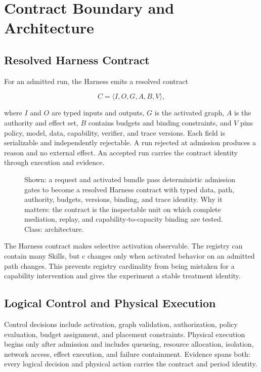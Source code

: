 \section{Contract Boundary and Architecture}
\label{sec:architecture}

\subsection{Resolved Harness Contract}

For an admitted run, the Harness emits a resolved contract

\begin{equation}
C=\langle I,O,G,A,B,V\rangle,
\end{equation}

where $I$ and $O$ are typed inputs and outputs, $G$ is the activated graph, $A$ is the authority and effect set, $B$ contains budgets and binding constraints, and $V$ pins policy, model, data, capability, verifier, and trace versions. Each field is serializable and independently rejectable. A run rejected at admission produces a reason and no external effect. An accepted run carries the contract identity through execution and evidence.

\begin{figure}[t]
\centering
\caption{Shown: a request and activated bundle pass deterministic admission gates to become a resolved Harness contract with typed data, path, authority, budgets, versions, binding, and trace identity. Why it matters: the contract is the inspectable unit on which complete mediation, replay, and capability-to-capacity binding are tested. Class: architecture.}
\label{fig:harness-contract}
\end{figure}

The Harness contract makes selective activation observable. The registry can contain many Skills, but c changes only when activated behavior on an admitted path changes. This prevents registry cardinality from being mistaken for a capability intervention and gives the experiment a stable treatment identity.

\subsection{Logical Control and Physical Execution}

Control decisions include activation, graph validation, authorization, policy evaluation, budget assignment, and placement constraints. Physical execution begins only after admission and includes queueing, resource allocation, isolation, network access, effect execution, and failure containment. Evidence spans both: every logical decision and physical action carries the contract and period identity.

